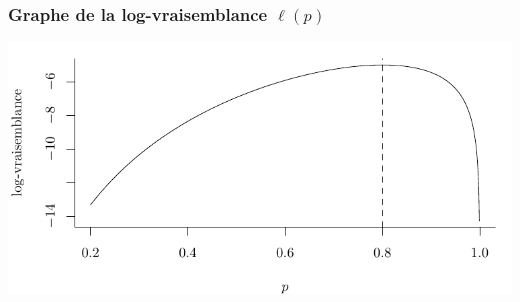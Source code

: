 \documentclass{beamer}
\begin{document}
\begin{frame}
\frametitle{Graphe de la log-vraisemblance $\ell(p)$}
\begin{center}
\includegraphics[width = \linewidth]{img/c3/loglikelihood_fr.pdf}
\end{center}

\end{frame}
% 
\end{document}
